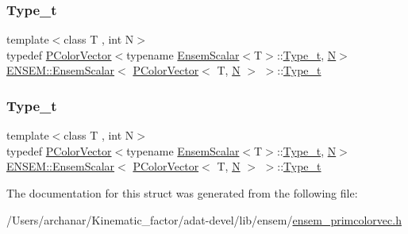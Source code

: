 \subsubsection{\texorpdfstring{Type\_t}{Type\_t}\hspace{0.1cm}{\footnotesize\ttfamily [2/3]}}
{\footnotesize\ttfamily template$<$class T , int N$>$ \\
typedef \mbox{\hyperlink{classENSEM_1_1PColorVector}{P\+Color\+Vector}}$<$typename \mbox{\hyperlink{structENSEM_1_1EnsemScalar}{Ensem\+Scalar}}$<$T$>$\+::\mbox{\hyperlink{structENSEM_1_1EnsemScalar_3_01PColorVector_3_01T_00_01N_01_4_01_4_a7a37dbe2ba322ec20fb55d0359c3f149}{Type\+\_\+t}}, \mbox{\hyperlink{adat__devel_2lib_2hadron_2operator__name__util_8cc_a7722c8ecbb62d99aee7ce68b1752f337}{N}}$>$ \mbox{\hyperlink{structENSEM_1_1EnsemScalar}{E\+N\+S\+E\+M\+::\+Ensem\+Scalar}}$<$ \mbox{\hyperlink{classENSEM_1_1PColorVector}{P\+Color\+Vector}}$<$ T, \mbox{\hyperlink{adat__devel_2lib_2hadron_2operator__name__util_8cc_a7722c8ecbb62d99aee7ce68b1752f337}{N}} $>$ $>$\+::\mbox{\hyperlink{structENSEM_1_1EnsemScalar_3_01PColorVector_3_01T_00_01N_01_4_01_4_a7a37dbe2ba322ec20fb55d0359c3f149}{Type\+\_\+t}}}

\mbox{\label{structENSEM_1_1EnsemScalar_3_01PColorVector_3_01T_00_01N_01_4_01_4_a7a37dbe2ba322ec20fb55d0359c3f149}} 
\subsubsection{\texorpdfstring{Type\_t}{Type\_t}\hspace{0.1cm}{\footnotesize\ttfamily [3/3]}}
{\footnotesize\ttfamily template$<$class T , int N$>$ \\
typedef \mbox{\hyperlink{classENSEM_1_1PColorVector}{P\+Color\+Vector}}$<$typename \mbox{\hyperlink{structENSEM_1_1EnsemScalar}{Ensem\+Scalar}}$<$T$>$\+::\mbox{\hyperlink{structENSEM_1_1EnsemScalar_3_01PColorVector_3_01T_00_01N_01_4_01_4_a7a37dbe2ba322ec20fb55d0359c3f149}{Type\+\_\+t}}, \mbox{\hyperlink{adat__devel_2lib_2hadron_2operator__name__util_8cc_a7722c8ecbb62d99aee7ce68b1752f337}{N}}$>$ \mbox{\hyperlink{structENSEM_1_1EnsemScalar}{E\+N\+S\+E\+M\+::\+Ensem\+Scalar}}$<$ \mbox{\hyperlink{classENSEM_1_1PColorVector}{P\+Color\+Vector}}$<$ T, \mbox{\hyperlink{adat__devel_2lib_2hadron_2operator__name__util_8cc_a7722c8ecbb62d99aee7ce68b1752f337}{N}} $>$ $>$\+::\mbox{\hyperlink{structENSEM_1_1EnsemScalar_3_01PColorVector_3_01T_00_01N_01_4_01_4_a7a37dbe2ba322ec20fb55d0359c3f149}{Type\+\_\+t}}}



The documentation for this struct was generated from the following file\+:\begin{DoxyCompactItemize}
\item 
/\+Users/archanar/\+Kinematic\+\_\+factor/adat-\/devel/lib/ensem/\mbox{\hyperlink{adat-devel_2lib_2ensem_2ensem__primcolorvec_8h}{ensem\+\_\+primcolorvec.\+h}}\end{DoxyCompactItemize}
